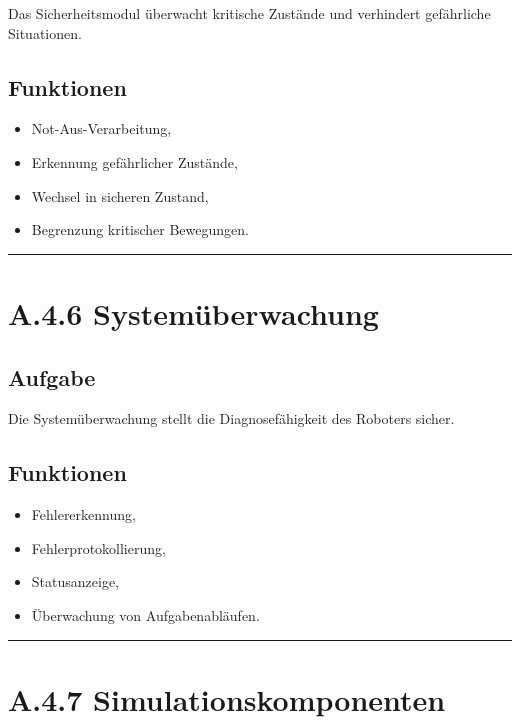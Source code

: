 \documentclass[
]{article}
\providecommand{\tightlist}{%
  \setlength{\itemsep}{0pt}\setlength{\parskip}{0pt}}
\begin{document}
Das Sicherheitsmodul überwacht kritische Zustände und verhindert
gefährliche Situationen.

\subsection{Funktionen}\label{funktionen-3}

\begin{itemize}
\tightlist
\item
  Not-Aus-Verarbeitung,
\item
  Erkennung gefährlicher Zustände,
\item
  Wechsel in sicheren Zustand,
\item
  Begrenzung kritischer Bewegungen.
\end{itemize}

\begin{center}\rule{0.5\linewidth}{0.5pt}\end{center}

\section{A.4.6 Systemüberwachung}\label{a.4.6-systemuxfcberwachung}

\subsection{Aufgabe}\label{aufgabe-10}

Die Systemüberwachung stellt die Diagnosefähigkeit des Roboters sicher.

\subsection{Funktionen}\label{funktionen-4}

\begin{itemize}
\tightlist
\item
  Fehlererkennung,
\item
  Fehlerprotokollierung,
\item
  Statusanzeige,
\item
  Überwachung von Aufgabenabläufen.
\end{itemize}

\begin{center}\rule{0.5\linewidth}{0.5pt}\end{center}

\section{A.4.7
Simulationskomponenten}\label{a.4.7-simulationskomponenten}
\end{document}
